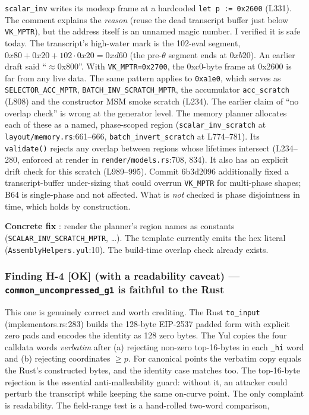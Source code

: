 \texttt{scalar\_inv} writes its modexp frame at a hardcoded
\texttt{let p := 0x2600} (L331). The comment explains the
\emph{reason} (reuse the dead transcript buffer just below
\texttt{VK\_MPTR}), but the address itself is an unnamed magic
number. I verified it is safe today. The transcript's high-water
mark is the 102-eval segment, $0x80+0x20+102\cdot0x20=0xd60$ (the
pre-$\theta$ segment ends at $0xb20$). An earlier draft said
``$\approx$0x800''. With \texttt{VK\_MPTR=0x2700}, the 0xc0-byte
frame at 0x2600 is far from any live data. The same pattern applies
to \texttt{0xa1e0}, which serves as \texttt{SELECTOR\_\allowbreak{}ACC\_\allowbreak{}MPTR},
\texttt{BATCH\_\allowbreak{}INV\_\allowbreak{}SCRATCH\_\allowbreak{}MPTR}, the accumulator
\texttt{acc\_scratch} (L808) and the constructor MSM smoke scratch
(L234).  The earlier claim of ``no overlap check''
is wrong at the generator level. The memory planner allocates each
of these as a named, phase-scoped region (\texttt{scalar\_\allowbreak{}inv\_\allowbreak{}scratch}
at \texttt{layout/memory.rs}:661--666, \texttt{batch\_\allowbreak{}invert\_\allowbreak{}scratch}
at L774--781). Its \texttt{validate()} rejects any overlap between
regions whose lifetimes intersect (L234--280, enforced at render in
\texttt{render/models.rs}:708, 834). It also has an explicit drift
check for this scratch (L989--995). Commit 6b3d2096 additionally
fixed a transcript-buffer under-sizing that could overrun
\texttt{VK\_MPTR} for multi-phase shapes; B64 is single-phase and
not affected. What is \emph{not} checked is phase disjointness in
time, which holds by construction.

\textbf{Concrete fix} : render the planner's region
names as constants (\texttt{SCALAR\_\allowbreak{}INV\_\allowbreak{}SCRATCH\_\allowbreak{}MPTR},
\ldots). The template currently emits the hex literal
(\texttt{AssemblyHelpers.yul}:10). The build-time overlap check
already exists.

\subsubsection*{Finding H-4 \textcolor{tracegreen}{[OK]} (with a readability caveat) --- \texttt{common\_\allowbreak{}uncompressed\_\allowbreak{}g1} is faithful to the Rust}

This one is genuinely correct and worth crediting. The Rust
\texttt{to\_input} (implementors.rs:283) builds the 128-byte EIP-2537
padded form with explicit zero pads and encodes the identity as 128
zero bytes. The Yul copies the four calldata words \emph{verbatim}
after (a) rejecting non-zero top-16-bytes in each \texttt{\_hi} word
and (b) rejecting coordinates $\ge p$. For canonical points the
verbatim copy equals the Rust's constructed bytes, and the identity
case matches too. The top-16-byte rejection is the essential
anti-malleability guard: without it, an attacker could perturb the
transcript while keeping the same on-curve point. The only complaint
is readability. The field-range test is a hand-rolled two-word
comparison,

